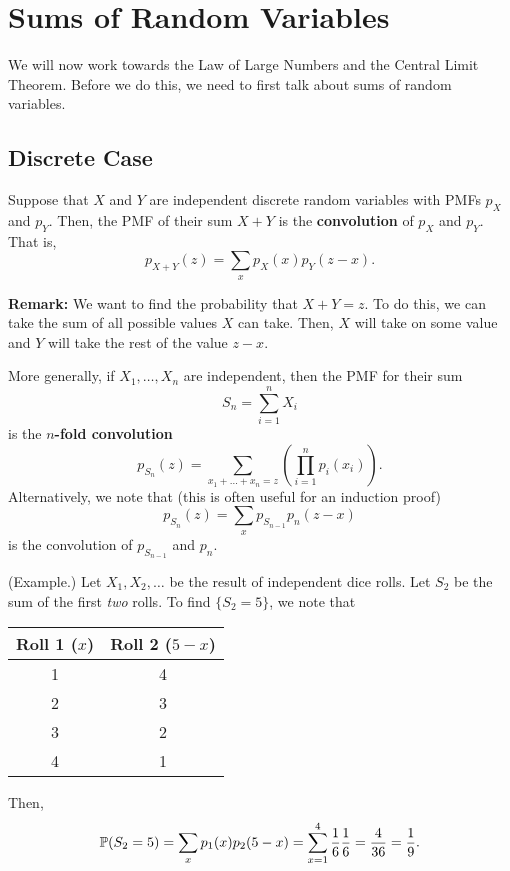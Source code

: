 \documentclass[letterpaper]{article}
\begin{document}
\section{Sums of Random Variables}
We will now work towards the Law of Large Numbers and the Central Limit Theorem. Before we do this, we need to first talk about sums of random variables.

\subsection{Discrete Case}
\begin{theorem}{}{}
    Suppose that $X$ and $Y$ are independent discrete random variables with PMFs $p_X$ and $p_Y$. Then, the PMF of their sum $X + Y$ is the \textbf{convolution} of $p_X$ and $p_Y$. That is, 
    \[p_{X + Y}(z) = \sum_x p_{X}(x) p_{Y}(z - x).\]
\end{theorem}
\textbf{Remark:} We want to find the probability that $X + Y = z$. To do this, we can take the sum of all possible values $X$ can take. Then, $X$ will take on some value and $Y$ will take the rest of the value $z - x$. 

\bigskip 

More generally, if $X_1, \dots, X_n$ are independent, then the PMF for their sum 
\[S_n = \sum_{i = 1}^{n} X_i\]
is the \textbf{$n$-fold convolution}
\[p_{S_n}(z) = \sum_{x_1 + \dots + x_n = z} \left(\prod_{i = 1}^{n} p_{i}(x_i)\right).\]
Alternatively, we note that (this is often useful for an induction proof)
\[p_{S_n}(z) = \sum_{x} p_{S_{n - 1}} p_{n}(z - x)\]
is the convolution of $p_{S_{n - 1}}$ and $p_n$.

\begin{mdframed}[]
    (Example.) Let $X_1, X_2, \dots$ be the result of independent dice rolls. Let $S_2$ be the sum of the first \emph{two} rolls. To find $\{S_2 = 5\}$, we note that 
    \begin{center}
        \begin{tabular}{||c|c||}
            \hline 
            Roll 1 ($x$) & Roll 2 ($5 - x$) \\ 
            \hline \hline 
            1 & 4 \\ 
            2 & 3 \\ 
            3 & 2 \\ 
            4 & 1 \\ 
            \hline 
        \end{tabular}
    \end{center}
    Then, 
    \[\mathbb{P}(S_2 = 5) = \sum_{x} p_{1}(x) p_{2}(5 - x) = \sum_{x = 1}^{4} \frac{1}{6} \frac{1}{6} = \frac{4}{36} = \frac{1}{9}.\]
\end{mdframed}
\end{document}
